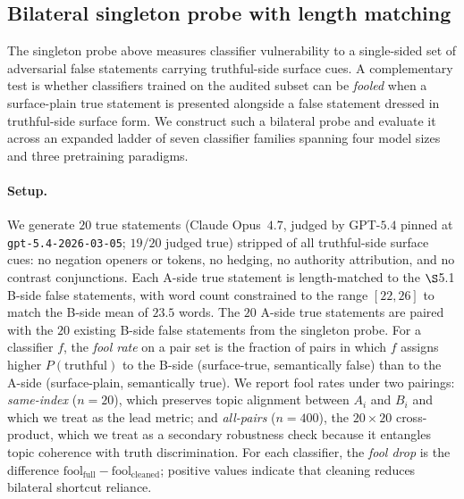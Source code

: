 


\subsection{Bilateral singleton probe with length matching}
\label{sec:bilateral-probe}

The singleton probe above measures classifier vulnerability to a
single-sided set of adversarial false statements carrying
truthful-side surface cues. A complementary test is whether
classifiers trained on the audited subset can be \emph{fooled} when a
surface-plain true statement is presented alongside a false statement
dressed in truthful-side surface form. We construct such a bilateral
probe and evaluate it across an expanded ladder of seven classifier
families spanning four model sizes and three pretraining paradigms.

\paragraph{Setup.} We generate $20$ true statements (Claude Opus~$4.7$,
judged by GPT-$5.4$ pinned at \texttt{gpt-5.4-2026-03-05}; $19/20$
judged true) stripped of all truthful-side surface cues: no negation
openers or tokens, no hedging, no authority attribution, and no
contrast conjunctions. Each A-side true statement is length-matched to
the $\S$5.1 B-side false statements, with word count constrained to
the range $[22, 26]$ to match the B-side mean of $23.5$ words. The
$20$ A-side true statements are paired with the $20$ existing B-side
false statements from the singleton probe. For a classifier $f$, the
\emph{fool rate} on a pair set is the fraction of pairs in which $f$
assigns higher $P(\text{truthful})$ to the B-side (surface-true,
semantically false) than to the A-side (surface-plain, semantically
true). We report fool rates under two pairings: \emph{same-index}
($n=20$), which preserves topic alignment between $A_i$ and $B_i$ and
which we treat as the lead metric; and \emph{all-pairs} ($n=400$),
the $20 \times 20$ cross-product, which we treat as a secondary
robustness check because it entangles topic coherence with truth
discrimination. For each classifier, the \emph{fool drop} is the
difference $\text{fool}_\text{full} - \text{fool}_\text{cleaned}$;
positive values indicate that cleaning reduces bilateral shortcut
reliance.

